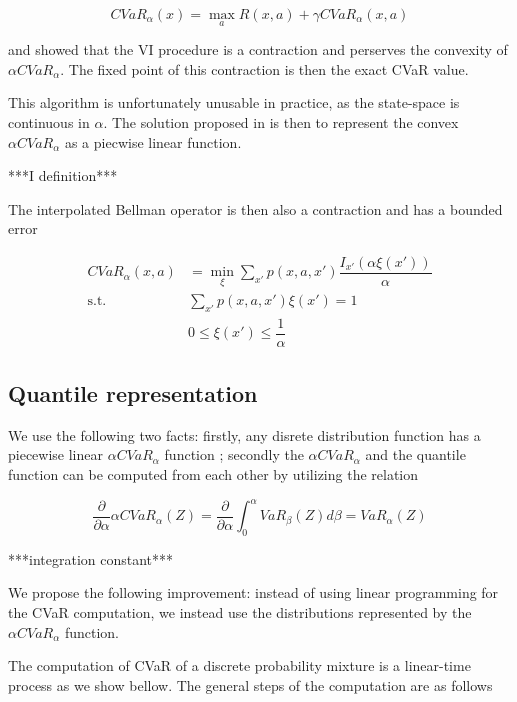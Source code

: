 \begin{equation}
CVaR_\alpha(x)=\max_a R(x, a) + \gamma CVaR_{\alpha}(x, a)
\end{equation}

and showed that the VI procedure is a contraction and perserves the convexity of $\alpha CVaR_\alpha$. The fixed point of this contraction is then the exact CVaR value.

This algorithm is unfortunately unusable in practice, as the state-space is continuous in $\alpha$. The solution proposed in \cite{chow2015risk} is then to represent the convex $\alpha CVaR_\alpha$ as a piecwise linear function. 

***I definition***

The interpolated Bellman operator is then also a contraction and has a bounded error

\begin{equation}
\begin{split}
CVaR_\alpha(x, a)&=\min_{\xi} \sum_{x'} p(x, a, x')\dfrac{I_{x'}(\alpha \xi(x'))}{\alpha}\\
\text{s.t.}\quad &\sum_{x'}p(x, a, x')\xi(x')=1\\
&0 \le \xi(x')\le \dfrac{1}{\alpha}
\end{split}
\end{equation}

\subsection{Quantile representation}

We use the following two facts: firstly, any disrete distribution function has a piecewise linear $\alpha CVaR_\alpha$ function \cite{rockafellar2000optimization}; secondly the $\alpha CVaR_\alpha$ and the quantile function can be computed from each other by utilizing the relation

\begin{equation}
\dfrac{\partial}{\partial \alpha} \alpha CVaR_\alpha(Z) = \dfrac{\partial}{\partial \alpha} \int_0^\alpha VaR_\beta(Z) d\beta = VaR_\alpha(Z)
\end{equation}

***integration constant***

We propose the following improvement: instead of using linear programming for the CVaR computation, we instead use the distributions represented by the $\alpha CVaR_\alpha$ function. 

The computation of CVaR of a discrete probability mixture is a linear-time process as we show bellow. The general steps of the computation are as follows

